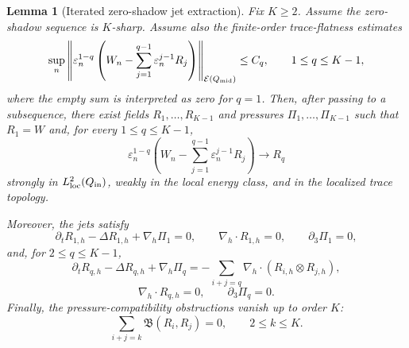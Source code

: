\documentclass[11pt]{article}
\numberwithin{equation}{section}
\theoremstyle{plain}
\newtheorem{lemma}{Lemma}[section]
\theoremstyle{definition}
\theoremstyle{remark}
\newcommand{\eps}{\varepsilon}
\newcommand{\nabh}{\nabla_h}
\newcommand{\divh}{\nabla_h\!\cdot}
\newcommand{\calB}{\mathfrak B}
\newcommand{\calE}{\mathcal E}
\begin{document}
\begin{lemma}[Iterated zero-shadow jet extraction]\label{pIII:lem:iterated-zero-shadow-jet-extraction}
Fix \(K\ge2\).  Assume the zero-shadow sequence is \(K\)-sharp.  Assume also the
finite-order trace-flatness estimates
\begin{equation}\label{pIII:eq:trace-flatness}
        \sup_n
        \left\|
        \eps_n^{1-q}
        \left(
        W_n-\sum_{j=1}^{q-1}\eps_n^{j-1}R_j
        \right)
        \right\|_{\calE(Q_{\rm mid})}
        \le C_q,
        \qquad
        1\le q\le K-1,
\end{equation}
where the empty sum is interpreted as zero for \(q=1\).  Then, after passing to a
subsequence, there exist fields \(R_1,\ldots,R_{K-1}\) and pressures
\(\Pi_1,\ldots,\Pi_{K-1}\) such that \(R_1=W\) and, for every \(1\le q\le K-1\),
\begin{equation}\label{pIII:eq:q-jet-convergence}
        \eps_n^{1-q}
        \left(
        W_n-\sum_{j=1}^{q-1}\eps_n^{j-1}R_j
        \right)
        \longrightarrow R_q
\end{equation}
strongly in \(L^2_{\rm loc}(Q_{\rm in})\), weakly in the local energy class, and in the
localized trace topology.

Moreover, the jets satisfy
\begin{equation}\label{pIII:eq:R1-equation}
        \partial_tR_{1,h}-\Delta R_{1,h}+\nabh\Pi_1=0,
        \qquad
        \divh R_{1,h}=0,
        \qquad
        \partial_3\Pi_1=0,
\end{equation}
and, for \(2\le q\le K-1\),
\begin{equation}\label{pIII:eq:Rq-equation}
        \partial_tR_{q,h}-\Delta R_{q,h}+\nabh\Pi_q
        =
        -\sum_{i+j=q}\nabh\cdot(R_{i,h}\otimes R_{j,h}),
\end{equation}
\begin{equation}\label{pIII:eq:Rq-strict}
        \divh R_{q,h}=0,
        \qquad
        \partial_3\Pi_q=0.
\end{equation}
Finally, the pressure-compatibility obstructions vanish up to order \(K\):
\begin{equation}\label{pIII:eq:jet-compat-up-to-K}
        \sum_{i+j=k}\calB(R_i,R_j)=0,
        \qquad
        2\le k\le K.
\end{equation}
\end{lemma}
\end{document}
